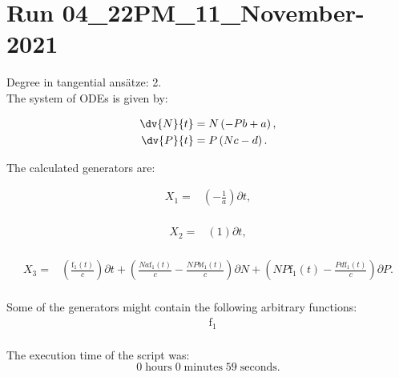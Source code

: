 \section*{Run 04\_22PM\_11\_November-2021}
Degree in tangential ansätze:	2.\\
The system of ODEs is given by:

\begin{align*}
\dv{N}{t}&=N \left(- P b + a\right),\\
\dv{P}{t}&=P \left(N c - d\right).\\
\end{align*}

\noindent The calculated generators are:

\begin{align*}
X_{1}=&\left(- \frac{1}{a} \right)\partial t,\\
\end{align*}

\begin{align*}
X_{2}=&\left(1 \right)\partial t,\\
\end{align*}

\begin{align*}
X_{3}=&\left(\frac{\operatorname{f_{1}}{\left(t \right)}}{c} \right)\partial t+\left(\frac{N a \operatorname{f_{1}}{\left(t \right)}}{c}- \frac{N P b \operatorname{f_{1}}{\left(t \right)}}{c} \right)\partial N+\left(N P \operatorname{f_{1}}{\left(t \right)} - \frac{P d \operatorname{f_{1}}{\left(t \right)}}{c} \right)\partial P.\\
\end{align*}



\noindent Some of the generators might contain the following arbitrary functions:
\begin{align*}
&\operatorname{f_{1}}\\
\end{align*}

\noindent The execution time of the script was:
$$0\;\mathrm{hours}\;0\;\mathrm{minutes}\;59 \;\mathrm{seconds}.$$
